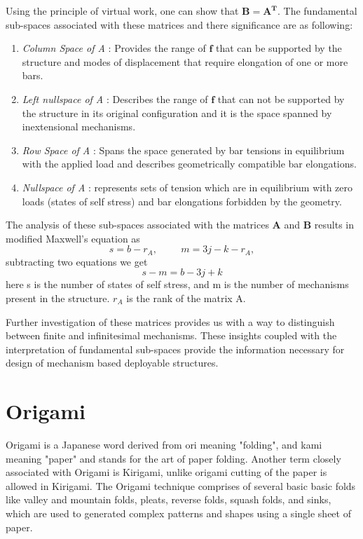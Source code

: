 \noindent Using the principle of virtual work, one can show that $\boldsymbol{B = A^T}$. The fundamental sub-spaces associated with these matrices and there significance are as following:

\begin{enumerate}
    \item \textit{Column Space of A} : Provides the range of $\boldsymbol{f}$ that can be supported by the structure and modes of displacement that require elongation of one or more bars.

    \item\textit{Left nullspace of A} : Describes the range of $\boldsymbol{f}$ that can not be supported by the structure in its original configuration and it is the space spanned by inextensional mechanisms.

    \item\textit{Row Space of A} : Spans the space generated by bar tensions in equilibrium with the applied load and describes geometrically compatible bar elongations.

    \item\textit{Nullspace of A} : represents sets of tension which are in equilibrium with zero loads (states of self stress) and bar elongations forbidden by the geometry.
\end{enumerate}



The analysis of these sub-spaces associated with the matrices $\boldsymbol{A}$ and $\boldsymbol{B}$ results in modified Maxwell's equation as
\begin{equation}
    s = b - r_{A},  \hspace{1cm} m = 3j - k - r_{A},
    \label{eq:cacona}
\end{equation}
\noindent subtracting two equations we get
\begin{equation}
    s - m = b - 3j + k
    \label{eq:cacona}
\end{equation}
\noindent here s is the number of states of self stress, and m is the number of mechanisms present in the structure. $r_{A}$ is the rank of the matrix A.

Further investigation of these matrices provides us with a way to distinguish between finite and infinitesimal mechanisms. These insights coupled with the interpretation of fundamental sub-spaces provide the information necessary for design of mechanism based deployable structures\cite{Pelle}.


\section{Origami}
Origami is a Japanese word derived from ori meaning "folding", and kami meaning "paper" and stands for the art of paper folding. Another term closely associated with Origami is Kirigami, unlike origami cutting of the paper is allowed in Kirigami. The Origami technique comprises of several basic basic folds like valley and mountain folds, pleats, reverse folds, squash folds, and sinks, which are used to generated complex patterns and shapes using a single sheet of paper.



